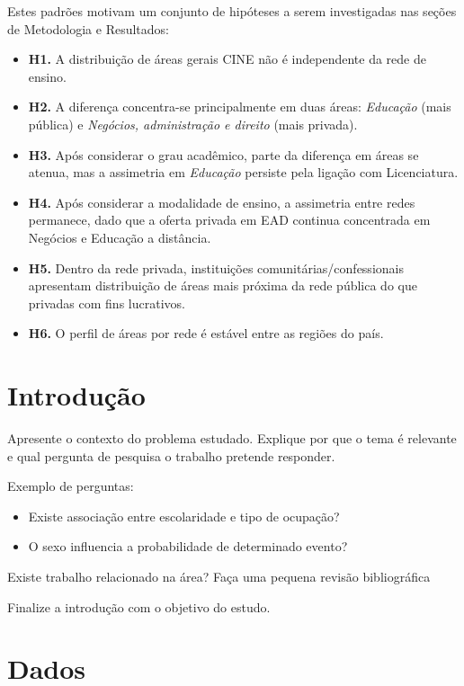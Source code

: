 \documentclass[12pt]{article}
\begin{document}
Estes padrões motivam um conjunto de hipóteses a serem investigadas nas seções de Metodologia e Resultados:

\begin{itemize}
    \item \textbf{H1.} A distribuição de áreas gerais CINE não é independente da rede de ensino.
    \item \textbf{H2.} A diferença concentra-se principalmente em duas áreas: \textit{Educação} (mais pública) e \textit{Negócios, administração e direito} (mais privada).
    \item \textbf{H3.} Após considerar o grau acadêmico, parte da diferença em áreas se atenua, mas a assimetria em \textit{Educação} persiste pela ligação com Licenciatura.
    \item \textbf{H4.} Após considerar a modalidade de ensino, a assimetria entre redes permanece, dado que a oferta privada em EAD continua concentrada em Negócios e Educação a distância.
    \item \textbf{H5.} Dentro da rede privada, instituições comunitárias/confessionais apresentam distribuição de áreas mais próxima da rede pública do que privadas com fins lucrativos.
    \item \textbf{H6.} O perfil de áreas por rede é estável entre as regiões do país.
\end{itemize}


\section{Introdução}

Apresente o contexto do problema estudado. Explique por que o tema é relevante e qual pergunta de pesquisa o trabalho pretende responder.

Exemplo de perguntas:

\begin{itemize}
\item Existe associação entre escolaridade e tipo de ocupação?
\item O sexo influencia a probabilidade de determinado evento?
\end{itemize}

Existe trabalho relacionado na área? Faça uma pequena revisão bibliográfica

\bigskip
Finalize a introdução com o objetivo do estudo.

\section{Dados}
\end{document}
